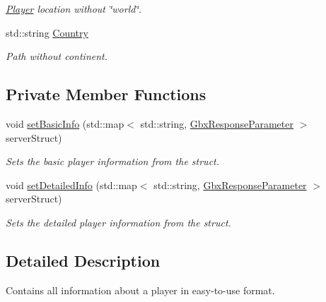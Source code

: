 \begin{DoxyCompactItemize}
\begin{DoxyCompactList}\small\item\em \hyperlink{structPlayer}{Player} location without \char`\"{}world\char`\"{}. \end{DoxyCompactList}\item 
\hypertarget{structPlayer_aa04503994922157165081fa29bf4729d}{std\-::string \hyperlink{structPlayer_aa04503994922157165081fa29bf4729d}{Country}}\label{structPlayer_aa04503994922157165081fa29bf4729d}

\begin{DoxyCompactList}\small\item\em Path without continent. \end{DoxyCompactList}\end{DoxyCompactItemize}
\subsection*{Private Member Functions}
\begin{DoxyCompactItemize}
\item 
void \hyperlink{structPlayer_ac4666bfba77342a37f3ab3628b26acd0}{set\-Basic\-Info} (std\-::map$<$ std\-::string, \hyperlink{classGbxResponseParameter}{Gbx\-Response\-Parameter} $>$ server\-Struct)
\begin{DoxyCompactList}\small\item\em Sets the basic player information from the struct. \end{DoxyCompactList}\item 
void \hyperlink{structPlayer_a179183e86a0b9a4b808593be96d65391}{set\-Detailed\-Info} (std\-::map$<$ std\-::string, \hyperlink{classGbxResponseParameter}{Gbx\-Response\-Parameter} $>$ server\-Struct)
\begin{DoxyCompactList}\small\item\em Sets the detailed player information from the struct. \end{DoxyCompactList}\end{DoxyCompactItemize}


\subsection{Detailed Description}
Contains all information about a player in easy-\/to-\/use format. 

